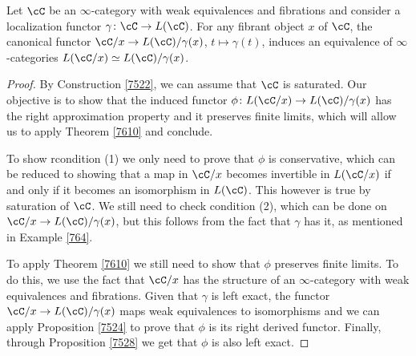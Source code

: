 \begin{cor}\label{7613}

  Let $\cC$ be an $\infty$-category with weak equivalences and fibrations and
  consider a localization functor $\gamma\colon\cC\rightarrow L(\cC)$. For any
  fibrant object $x$ of $\cC$, the canonical functor $\cC/x\rightarrow
  L(\cC)/\gamma(x)$, $t\mapsto\gamma(t)$, induces an equivalence of
  $\infty$-categories $L(\cC/x)\simeq L(\cC)/\gamma(x)$.
\end{cor}
\begin{proof}

  By Construction \ref{7522}, we can assume that $\cC$ is saturated. Our
  objective is to show
  that the induced functor $\phi\colon L(\cC/x)\rightarrow L(\cC)/\gamma(x)$ has
  the right approximation property and it preserves finite limits, which will
  allow us to apply Theorem \ref{7610} and conclude.

  To show rcondition (1) we only need to prove that $\phi$ is conservative, which
  can be reduced to showing that a map in $\cC/x$ becomes invertible in
  $L(\cC/x)$ if and only if it becomes an isomorphism in $L(\cC)$. This however
  is true by
  saturation of $\cC$. We still need to check condition (2), which can be done
  on $\cC/x\rightarrow L(\cC)/\gamma(x)$, but this follows from the fact that
  $\gamma$ has it, as mentioned in Example \ref{764}.

  To apply Theorem \ref{7610} we still need to show that $\phi$ preserves finite
  limits. To do this, we use the fact that $\cC/x$ has the structure of an
  $\infty$-category with weak equivalences and fibrations. Given that $\gamma$
  is left exact, the functor $\cC/x\rightarrow L(\cC)/\gamma(x)$ maps weak
  equivalences to isomorphisms and we can apply Proposition \ref{7524} to prove
  that $\phi$ is its right derived functor. Finally, through Proposition
  \ref{7528} we get that $\phi$ is also left exact.
\end{proof}

